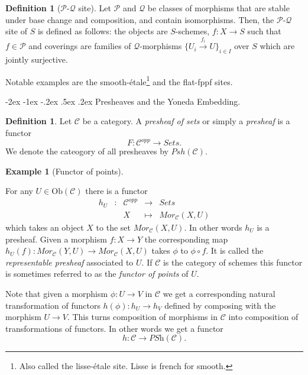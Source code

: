 \documentclass[11pt]{amsart}
\makeatletter
\renewcommand\subsection{\@startsection {subsection}{1}{\z@}%
	{-2ex \@plus -1ex \@minus -.2ex}%
	{.5ex \@plus.2ex}%
	{\normalfont\bfseries}}
\newcommand{\Ob}{\text{Ob}}
\theoremstyle{definition}
\newtheorem{definition}[theorem]{Definition}
\newtheorem{example}[theorem]{Example}
\makeatother
\begin{document}
\begin{definition}[$\mathcal{P}$-$\mathcal{Q}$ site]
	Let $\mathcal{P}$ and $\mathcal{Q}$ be classes of morphisms that are stable under base change and composition, and contain isomorphisms. Then, the $\mathcal{P}$-$\mathcal{Q}$ site of $S$ is defined as follows: the objects are $S$-schemes, $f:X\rightarrow S$ such that $f\in \mathcal{P}$ and coverings are families of $\mathcal{Q}$-morphisms $\{U_i \overset{f_i}{\to} U\}_{i\in I}$ over $S$ which are jointly surjective.
\end{definition}

Notable examples are the smooth-\'{e}tale\footnote{Also called the lisse-\'{e}tale site. Lisse is french for smooth.} and the flat-fppf sites.

\subsection{Presheaves and the Yoneda Embedding.}

\begin{definition}
	Let $\mathcal{C}$ be a category. A \textit{presheaf of sets} or simply a \textit{presheaf} is a functor
	\[F:\mathcal{C}^{opp}\rightarrow \mathit{Sets}.\]
	We denote the cateogory of all presheaves by $\mathit{Psh}(\mathcal{C})$.
\end{definition}

\begin{example}[Functor of points]
	\label{example-hom-functor}

	For any $U\in \Ob(\mathcal{C})$ there is a
	functor
	$$
	\begin{matrix}
	h_U & : & \mathcal{C}^{opp}
	&
	\longrightarrow
	&
	\textit{Sets} \\
	& &
	X
	&
	\longmapsto
	&
	\textit{Mor}_\mathcal{C}(X, U)
	\end{matrix}
	$$
	which takes an object $X$ to the set
	$\textit{Mor}_\mathcal{C}(X, U)$. In other words $h_U$ is a presheaf.
	Given a morphism $f : X\to Y$ the corresponding map
	$h_U(f) :  \textit{Mor}_\mathcal{C}(Y, U)\to \textit{Mor}_\mathcal{C}(X, U)$
	takes $\phi$ to $\phi\circ f$. It is called the {\it representable presheaf} associated to $U$.
	If $\mathcal{C}$ is the category of schemes this functor is
	sometimes referred to as the
	\emph{functor of points} of $U$.
\end{example}

Note that given a morphism $\phi : U \to V$ in $\mathcal{C}$ we get a
corresponding natural transformation of functors $h(\phi) : h_U \to h_V$
defined by composing with the morphism $U \to V$. This turns
composition of morphisms in $\mathcal{C}$ into composition of
transformations of functors. In other words we get a functor
$$
h :
\mathcal{C}
\longrightarrow
\textit{PSh}(\mathcal{C}).
$$
\end{document}
